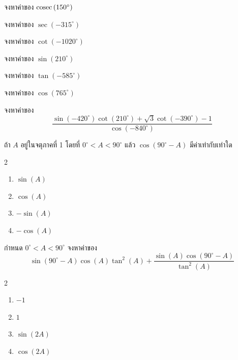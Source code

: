 \begin{examplebox}
จงหาค่าของ $\operatorname{cosec}\left(150^{\circ}\right)$
\end{examplebox}
\vspace{3cm}
\begin{examplebox}
จงหาค่าของ $\sec\left(-315^{\circ}\right)$
\end{examplebox}
\vspace{3cm}
\begin{examplebox}
จงหาค่าของ $\cot\left(-1020^{\circ}\right)$
\end{examplebox}
\vspace{3cm}
\begin{examplebox}
จงหาค่าของ $\sin\left(210^{\circ}\right)$
\end{examplebox}
\newpage
\begin{examplebox}
จงหาค่าของ $\tan\left(-585^{\circ}\right)$
\end{examplebox}
\vspace{3cm}
\begin{examplebox}
จงหาค่าของ $\cos\left(765^{\circ}\right)$
\end{examplebox}
\vspace{3cm}
\begin{examplebox}
จงหาค่าของ 
\[\dfrac{\sin(-420^{\circ})\cot(210^{{\circ}})+\sqrt{3}\cot(-390^{{\circ}})-1}{\cos(-840^{\circ})}\]
\end{examplebox}
\newpage
\begin{examplebox}
ถ้า $A$ อยู่ในจตุภาคที่ 1 โดยที่ $0^{\circ}<A<90^{\circ}$ แล้ว $\cos(90^{\circ}-A)$ มีค่าเท่ากับเท่าใด
\begin{multicols}{2}
\begin{enumerate}
\item $\sin(A)$
\item $\cos(A)$
\item $-\sin(A)$
\item $-\cos(A)$
\end{enumerate}
\end{multicols}
\end{examplebox}
\newpage
\begin{examplebox}
กำหนด $0^{\circ}<A<90^{\circ}$ จงหาค่าของ 
\[\sin(90^{\circ}-A)\cos(A)\tan^2(A)+\dfrac{\sin(A) \cos(90^{\circ}-A)}{\tan^2(A)}\]
\begin{multicols}{2}
\begin{enumerate}
\item $-1$
\item $1$
\item $\sin(2A)$
\item $\cos(2A)$
\end{enumerate}
\end{multicols}
\end{examplebox}
